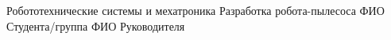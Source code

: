 \documentclass{bmstu}
\begin{document}
                {Робототехнические системы и мехатроника}                       %
                {Разработка робота-пылесоса}                                    %
                {ФИО Студента/группа}                                           %
                {ФИО Руководителя}                                              %
                {}                                                              %
\end{document}
